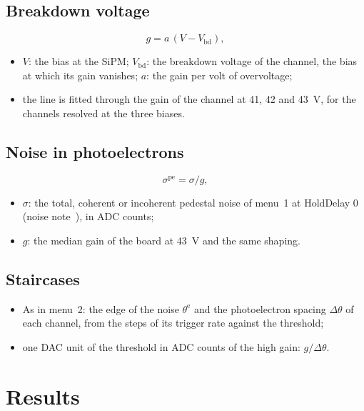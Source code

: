 \documentclass[11pt,a4paper]{article}
\begin{document}
\subsection{Breakdown voltage}

\begin{equation*}
g = a\,(V - V_\mathrm{bd}),
\end{equation*}
\begin{itemize}
\item $V$: the bias at the SiPM; $V_\mathrm{bd}$: the breakdown voltage of the channel, the
  bias at which its gain vanishes; $a$: the gain per volt of overvoltage;
\item the line is fitted through the gain of the channel at 41, 42 and 43~V, for the channels
  resolved at the three biases.
\end{itemize}

\subsection{Noise in photoelectrons}

\begin{equation*}
\sigma^\mathrm{pe} = \sigma / g,
\end{equation*}
\begin{itemize}
\item $\sigma$: the total, coherent or incoherent pedestal noise of menu~1 at HoldDelay 0
  (noise note~\cite{noisenote}), in ADC counts;
\item $g$: the median gain of the board at 43~V and the same shaping.
\end{itemize}

\subsection{Staircases}

\begin{itemize}
\item As in menu~2: the edge of the noise $\theta^\mathrm{e}$ and the photoelectron spacing
  $\Delta\theta$ of each channel, from the steps of its trigger rate against the threshold;
\item one DAC unit of the threshold in ADC counts of the high gain: $g / \Delta\theta$.
\end{itemize}

\section{Results}
\end{document}
